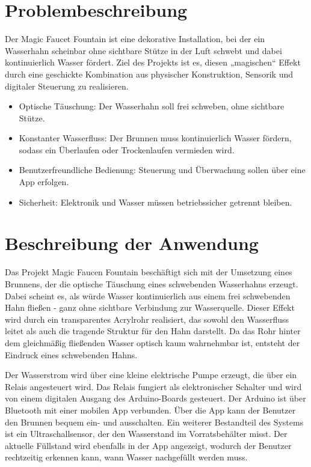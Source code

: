 %
%
%
%

\section{Problembeschreibung}
{
	Der Magic Faucet Fountain ist eine dekorative Installation, bei der ein Wasserhahn scheinbar ohne sichtbare Stütze in der Luft schwebt und dabei kontinuierlich Wasser fördert. Ziel des Projekts ist es, diesen „magischen“ Effekt durch eine geschickte Kombination aus physischer Konstruktion, Sensorik und digitaler Steuerung zu realisieren.
}

{
	\begin{itemize}
		\item Optische Täuschung: Der Wasserhahn soll frei schweben, ohne sichtbare Stütze.
		\item Konstanter Wasserfluss: Der Brunnen muss kontinuierlich Wasser fördern, sodass ein Überlaufen oder Trockenlaufen vermieden wird.
		\item Benutzerfreundliche Bedienung: Steuerung und Überwachung sollen über eine App erfolgen.
		\item Sicherheit: Elektronik und Wasser müssen betriebssicher getrennt bleiben.
	\end{itemize}
}

\section{Beschreibung der Anwendung}
{
	Das Projekt Magic Faucen Fountain beschäftigt sich mit der Umsetzung eines Brunnens, der die optische Täuschung eines schwebenden Wasserhahns erzeugt. Dabei scheint es, als würde Wasser kontinuierlich aus einem frei schwebenden Hahn fließen - ganz ohne sichtbare Verbindung zur Wasserquelle.
	Dieser Effekt wird durch ein transparentes Acrylrohr realisiert, das sowohl den Wasserfluss leitet als auch die tragende Struktur für den Hahn darstellt. Da das Rohr hinter dem gleichmäßig fließenden Wasser optisch kaum wahrnehmbar ist, entsteht der Eindruck eines schwebenden Hahns.
}

\STANDARD{}
{
	Der Wasserstrom wird über eine kleine elektrische Pumpe erzeugt, die über ein Relais angesteuert wird. Das Relais fungiert als elektronischer Schalter und wird von einem digitalen Ausgang des Arduino-Boards gesteuert. Der Arduino ist über Bluetooth mit einer mobilen App verbunden. Über die App kann der Benutzer den Brunnen bequem ein- und ausschalten.
	Ein weiterer Bestandteil des Systems ist ein Ultraschallsensor, der den Wasserstand im Vorratsbehälter misst. Der aktuelle Füllstand wird ebenfalls in der App angezeigt, wodurch der Benutzer rechtzeitig erkennen kann, wann Wasser nachgefüllt werden muss.
}

